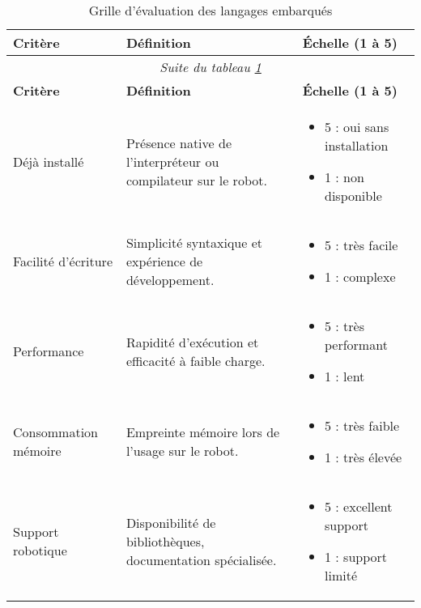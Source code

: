 \begin{longtable}{|p{}|p{}|p{}|}
\caption{\label{tab:criteria_robot_languages} Grille d’évaluation des langages embarqués} \\

\hline
\textbf{Critère} & \textbf{Définition} & \textbf{Échelle (1 à 5)} \\
\hline
\endfirsthead

\multicolumn{3}{c}{\textit{Suite du tableau \ref{tab:criteria_robot_languages}}} \\
\hline
\textbf{Critère} & \textbf{Définition} & \textbf{Échelle (1 à 5)} \\
\hline
\endhead

Déjà installé & Présence native de l’interpréteur ou compilateur sur le robot. & 
\begin{itemize}
  \item 5 : oui sans installation
  \item 1 : non disponible
\end{itemize} \\
\hline

Facilité d’écriture & Simplicité syntaxique et expérience de développement. & 
\begin{itemize}
  \item 5 : très facile
  \item 1 : complexe
\end{itemize} \\
\hline

Performance & Rapidité d’exécution et efficacité à faible charge. & 
\begin{itemize}
  \item 5 : très performant
  \item 1 : lent
\end{itemize} \\
\hline

Consommation mémoire & Empreinte mémoire lors de l’usage sur le robot. & 
\begin{itemize}
  \item 5 : très faible
  \item 1 : très élevée
\end{itemize} \\
\hline

Support robotique & Disponibilité de bibliothèques, documentation spécialisée. & 
\begin{itemize}
  \item 5 : excellent support
  \item 1 : support limité
\end{itemize} \\
\hline


\end{longtable}
